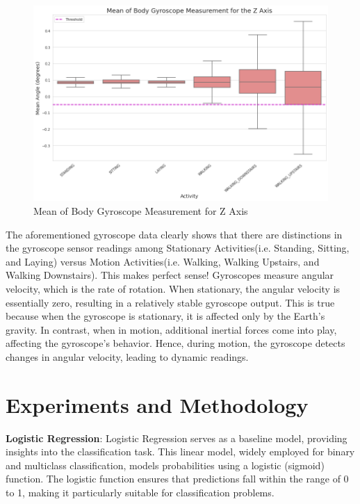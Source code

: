 \documentclass[11pt]{article}
\begin{document}
\begin{figure}[h!]
	\includegraphics[width= 1.0 \linewidth]{mean_body_gyroscope_z.png}
	\centering
	\caption{Mean of Body Gyroscope Measurement for Z Axis}
	\label{mean_body_gyroscope_z.png}
\end{figure}

The aforementioned gyroscope data clearly shows that there are distinctions in the gyroscope sensor readings among Stationary Activities(i.e. Standing, Sitting, and Laying) versus Motion Activities(i.e. Walking, Walking Upstairs, and Walking Downstairs). This makes perfect sense! Gyroscopes measure angular velocity, which is the rate of rotation. When stationary, the angular velocity is essentially zero, resulting in a relatively stable gyroscope output. This is true because when the gyroscope is stationary, it is affected only by the Earth's gravity. In contrast, when in motion, additional inertial forces come into play, affecting the gyroscope's behavior. Hence, during motion, the gyroscope detects changes in angular velocity, leading to dynamic readings.

\section{Experiments and Methodology}
\textbf{Logistic Regression}: 
Logistic Regression serves as a baseline model, providing insights into the classification task. This linear model, widely employed for binary and multiclass classification, models probabilities using a logistic (sigmoid) function. The logistic function ensures that predictions fall within the range of 0 to 1, making it particularly suitable for classification problems.
\end{document}
